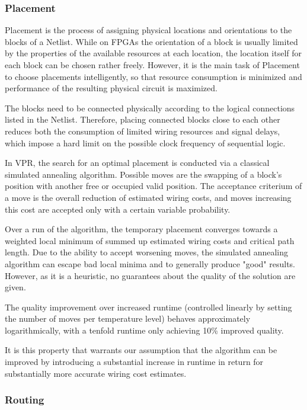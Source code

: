 \subsubsection{Placement}

Placement is the process of assigning physical locations and orientations to the blocks of a Netlist. While on \glspl{FPGA} the orientation of a block is usually limited by the properties of the available resources at each location, the location itself for each block can be chosen rather freely. However, it is the main task of Placement to choose placements intelligently, so that resource consumption is minimized and performance of the resulting physical circuit is maximized.

The blocks need to be connected physically according to the logical connections listed in the Netlist. Therefore, placing connected blocks close to each other reduces both the consumption of limited wiring resources and signal delays, which impose a hard limit on the possible clock frequency of sequential logic.

In \gls{VPR}, the search for an optimal placement is conducted via a classical simulated annealing algorithm. Possible moves are the swapping of a block's position with another free or occupied valid position. The acceptance criterium of a move is the overall reduction of estimated wiring costs, and moves increasing this cost are accepted only with a certain variable probability.

Over a run of the algorithm, the temporary placement converges towards a weighted local minimum of summed up estimated wiring costs and critical path length. Due to the ability to accept worsening moves, the simulated annealing algorithm can escape bad local minima and to generally produce "good" results. However, as it is a heuristic, no guarantees about the quality of the solution are given.

The quality improvement over increased runtime (controlled linearly by setting the number of moves per temperature level) behaves approximately logarithmically, with a tenfold runtime only achieving 10\% improved quality.\cite{vtr8}

It is this property that warrants our assumption that the algorithm can be improved by introducing a substantial increase in runtime in return for substantially more accurate wiring cost estimates.

\subsubsection{Routing}

